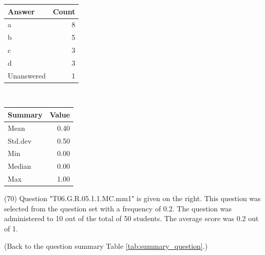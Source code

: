 \documentclass[12pt,english,nohyper]{tufte-handout}\usepackage[]{graphicx}\usepackage[]{color}
\begin{document}
\begin{center}%
\begin{tabular}{lr}
  \hline
Answer & Count \\ 
  \hline
a &   8 \\ 
  b &   5 \\ 
  c &   3 \\ 
  d &   3 \\ 
  Unanswered &   1 \\ 
   \hline
\end{tabular}
~~~~~~~~%
\begin{tabular}{lr}
  \hline
Summary & Value \\ 
  \hline
Mean & 0.40 \\ 
  Std.dev & 0.50 \\ 
  Min & 0.00 \\ 
  Median & 0.00 \\ 
  Max & 1.00 \\ 
   \hline
\end{tabular}
\end{center}\newpage{} (70) Question "T06.G.R.05.1.1.MC.mm1" is given on the right. This question was selected from the question set with a frequency of 0.2. The question was administered to 10 out of the total of 50 students. The average score was 0.2 out of 1.

 (Back to the question summary Table \ref{tab:summary_question}.)
\end{document}
